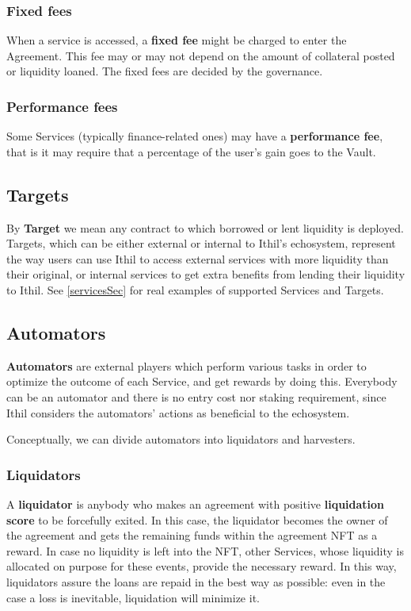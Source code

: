 \documentclass[a4paper,10 pt]{article}
\theoremstyle{definition}
\begin{document}
\subsubsection{Fixed fees}\label{fixedFeesSubSub}
When a service is accessed, a {\bf fixed fee} might be charged to enter the Agreement. This fee may or may not depend on the amount of collateral posted or liquidity loaned. The fixed fees are decided by the governance.

\subsubsection{Performance fees}\label{fixedFeesSubSub}
Some Services (typically finance-related ones) may have a {\bf performance fee}, that is it may require that a percentage of the user's gain goes to the Vault.

\subsection{Targets}\label{targetsSub}

By {\bf Target} we mean any contract to which borrowed or lent liquidity is deployed. Targets, which can be either external or internal to Ithil's echosystem, represent the way users can use Ithil to access external services with more liquidity than their original, or internal services to get extra benefits from lending their liquidity to Ithil. See \ref{servicesSec} for real examples of supported Services and Targets.

\subsection{Automators}\label{automatorsSub}

{\bf Automators} are external players which perform various tasks in order to optimize the outcome of each Service, and get rewards by doing this. Everybody can be an automator and there is no entry cost nor staking requirement, since Ithil considers the automators' actions as beneficial to the echosystem. 

Conceptually, we can divide automators into liquidators and harvesters.

\subsubsection{Liquidators}\label{liquidatorSubSub}
A {\bf liquidator} is anybody who makes an agreement with positive {\bf liquidation score} to be forcefully exited. In this case, the liquidator becomes the owner of the agreement and gets the remaining funds within the agreement NFT as a reward. In case no liquidity is left into the NFT, other Services, whose liquidity is allocated on purpose for these events, provide the necessary reward. In this way, liquidators assure the loans are repaid in the best way as possible: even in the case a loss is inevitable, liquidation will minimize it.
\end{document}
